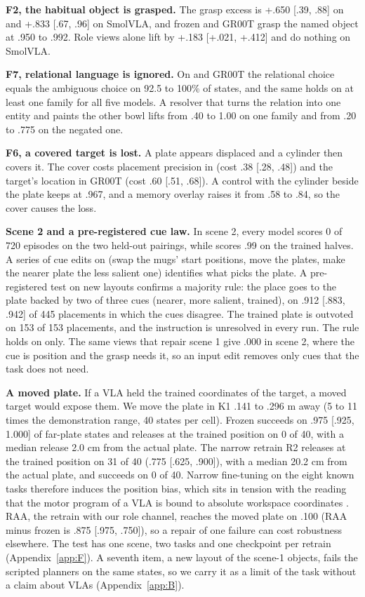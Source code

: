 \textbf{F2, the habitual object is grasped.} The grasp excess is +.650 [.39, .88] on \pizero{} and +.833 [.67, .96] on SmolVLA, and frozen \pifive{} and GR00T grasp the named object at .950 to .992. Role views alone lift \pizero{} by +.183 [+.021, +.412] and do nothing on SmolVLA.

\textbf{F7, relational language is ignored.} On \pifive{} and GR00T the relational choice equals the ambiguous choice on 92.5 to 100\% of states, and the same holds on at least one family for all five models. A resolver that turns the relation into one entity and paints the other bowl lifts \pifive{} from .40 to 1.00 on one family and from .20 to .775 on the negated one.

\textbf{F6, a covered target is lost.} A plate appears displaced and a cylinder then covers it. The cover costs placement precision in \pifive{} (cost .38 [.28, .48]) and the target's location in GR00T (cost .60 [.51, .68]). A control with the cylinder beside the plate keeps \pifive{} at .967, and a memory overlay raises it from .58 to .84, so the cover causes the loss.

\textbf{Scene 2 and a pre-registered cue law.} In scene 2, every model scores 0 of 720 episodes on the two held-out pairings, while \pifive{} scores .99 on the trained halves. A series of cue edits on \pifive{} (swap the mugs' start positions, move the plates, make the nearer plate the less salient one) identifies what picks the plate. A pre-registered test on new layouts confirms a majority rule: the place goes to the plate backed by two of three cues (nearer, more salient, trained), on .912 [.883, .942] of 445 placements in which the cues disagree. The trained plate is outvoted on 153 of 153 placements, and the instruction is unresolved in every run. The rule holds on \pifive{} only. The same views that repair scene 1 give .000 in scene 2, where the cue is position and the grasp needs it, so an input edit removes only cues that the task does not need.

\textbf{A moved plate.} If a VLA held the trained coordinates of the target, a moved target would expose them. We move the plate in K1 .141 to .296 m away (5 to 11 times the demonstration range, 40 states per cell). Frozen \pifive{} succeeds on .975 [.925, 1.000] of far-plate states and releases at the trained position on 0 of 40, with a median release 2.0 cm from the actual plate. The narrow retrain R2 releases at the trained position on 31 of 40 (.775 [.625, .900]), with a median 20.2 cm from the actual plate, and succeeds on 0 of 40. Narrow fine-tuning on the eight known tasks therefore induces the position bias, which sits in tension with the reading that the motor program of a VLA is bound to absolute workspace coordinates \citep{grant2603}. RAA, the retrain with our role channel, reaches the moved plate on .100 (RAA minus frozen \pifive{} is \mi.875 [\mi.975, \mi.750]), so a repair of one failure can cost robustness elsewhere. The test has one scene, two tasks and one checkpoint per retrain (Appendix~\ref{app:F}). A seventh item, a new layout of the scene-1 objects, fails the scripted planners on the same states, so we carry it as a limit of the task without a claim about VLAs (Appendix~\ref{app:B}).


